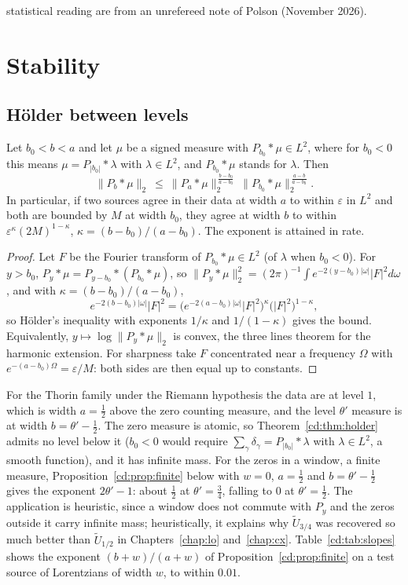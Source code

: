 statistical reading are from an unrefereed note of Polson (November 2026).


\section{Stability}\label{cd:sec:stability}

\subsection{H\"older between levels}

\begin{theorem}\label{cd:thm:holder}
Let $b_0<b<a$ and let $\mu$ be a signed measure with $P_{b_0}*\mu\in L^2$, where for $b_0<0$ this means $\mu=P_{|b_0|}*\lambda$ with $\lambda\in L^2$, and $P_{b_0}*\mu$ stands for $\lambda$. Then
\[
\|P_b*\mu\|_2\ \le\ \|P_a*\mu\|_2^{\,\frac{b-b_0}{a-b_0}}\ \|P_{b_0}*\mu\|_2^{\,\frac{a-b}{a-b_0}} .
\]
In particular, if two sources agree in their data at width $a$ to within $\varepsilon$ in $L^2$ and both are bounded by $M$ at width $b_0$, they agree at width $b$ to within $\varepsilon^{\kappa}(2M)^{1-\kappa}$, $\kappa=(b-b_0)/(a-b_0)$. The exponent is attained in rate.
\end{theorem}

\begin{proof}
Let $F$ be the Fourier transform of $P_{b_0}*\mu\in L^2$ (of $\lambda$ when $b_0<0$). For $y>b_0$, $P_y*\mu=P_{y-b_0}*(P_{b_0}*\mu)$, so $\|P_y*\mu\|_2^2=(2\pi)^{-1}\int e^{-2(y-b_0)|\omega|}|F|^2d\omega$, and with $\kappa=(b-b_0)/(a-b_0)$,
\[
e^{-2(b-b_0)|\omega|}|F|^2=\bigl(e^{-2(a-b_0)|\omega|}|F|^2\bigr)^{\kappa}\bigl(|F|^2\bigr)^{1-\kappa},
\]
so H\"older's inequality with exponents $1/\kappa$ and $1/(1-\kappa)$ gives the bound. Equivalently, $y\mapsto\log\|P_y*\mu\|_2$ is convex, the three lines theorem for the harmonic extension. For sharpness take $F$ concentrated near a frequency $\Omega$ with $e^{-(a-b_0)\Omega}=\varepsilon/M$: both sides are then equal up to constants.
\end{proof}

For the Thorin family under the Riemann hypothesis the data are at level $1$, which is width $a=\tfrac12$ above the zero counting measure, and the level $\theta'$ measure is at width $b=\theta'-\tfrac12$. The zero measure is atomic, so Theorem~\ref{cd:thm:holder} admits no level below it ($b_0<0$ would require $\sum_\gamma\delta_\gamma=P_{\lvert b_0\rvert}*\lambda$ with $\lambda\in L^2$, a smooth function), and it has infinite mass. For the zeros in a window, a finite measure, Proposition~\ref{cd:prop:finite} below with $w=0$, $a=\tfrac12$ and $b=\theta'-\tfrac12$ gives the exponent $2\theta'-1$: about $\tfrac12$ at $\theta'=\tfrac34$, falling to $0$ at $\theta'=\tfrac12$. The application is heuristic, since a window does not commute with $P_y$ and the zeros outside it carry infinite mass; heuristically, it explains why $\widetilde U_{3/4}$ was recovered so much better than $\widetilde U_{1/2}$ in Chapters~\ref{chap:lo} and~\ref{chap:cx}. Table~\ref{cd:tab:slopes} shows the exponent $(b+w)/(a+w)$ of Proposition~\ref{cd:prop:finite} on a test source of Lorentzians of width $w$, to within $0.01$.

